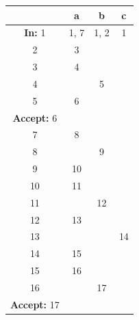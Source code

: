\documentclass[12pt]{article}
\begin{document}
\begin{center}
  \begin{tabular}{|c|c|c|c|}
    \hline
     & a & b & c \\
    \hline
    \textbf{In:} 1 & 1, 7 & 1, 2 & 1 \\
    \hline
    2 & 3 &  & \\
    \hline
    3 & 4 &  & \\
    \hline
    4 &  & 5 & \\
    \hline
    5 & 6 &  & \\
    \hline
    \textbf{Accept:} 6&  &  & \\
    \hline
    7 & 8 &  & \\
    \hline
    8 &  & 9 & \\
    \hline
    9 & 10 &  & \\
    \hline
    10 & 11 &  & \\
    \hline
    11 &  & 12 & \\
    \hline
    12 & 13 &  & \\
    \hline
    13 &  &  & 14\\
    \hline
    14 &  15& & \\
    \hline
    15 &  16& & \\
    \hline
    16 &  & 17& \\
    \hline
    \textbf{Accept:} 17&  & & \\
    \hline
  \end{tabular}
\end{center}
\end{document}
